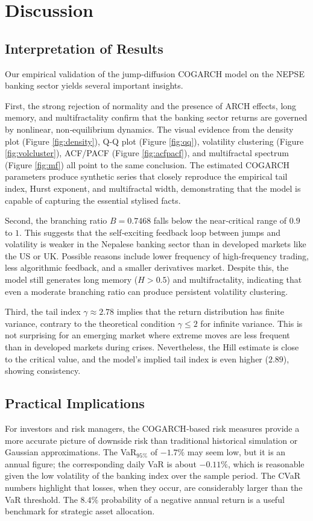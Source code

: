 \chapter{Discussion}

\section{Interpretation of Results}
Our empirical validation of the jump‑diffusion COGARCH model on the NEPSE banking sector yields several important insights.

First, the strong rejection of normality and the presence of ARCH effects, long memory, and multifractality confirm that the banking sector returns are governed by nonlinear, non‑equilibrium dynamics. The visual evidence from the density plot (Figure \ref{fig:density}), Q-Q plot (Figure \ref{fig:qq}), volatility clustering (Figure \ref{fig:volcluster}), ACF/PACF (Figure \ref{fig:acfpacf}), and multifractal spectrum (Figure \ref{fig:mf}) all point to the same conclusion. The estimated COGARCH parameters produce synthetic series that closely reproduce the empirical tail index, Hurst exponent, and multifractal width, demonstrating that the model is capable of capturing the essential stylised facts.

Second, the branching ratio $B=0.7468$ falls below the near‑critical range of $0.9$ to $1$. This suggests that the self‑exciting feedback loop between jumps and volatility is weaker in the Nepalese banking sector than in developed markets like the US or UK. Possible reasons include lower frequency of high‑frequency trading, less algorithmic feedback, and a smaller derivatives market. Despite this, the model still generates long memory ($H>0.5$) and multifractality, indicating that even a moderate branching ratio can produce persistent volatility clustering.

Third, the tail index $\gamma \approx 2.78$ implies that the return distribution has finite variance, contrary to the theoretical condition $\gamma \le 2$ for infinite variance. This is not surprising for an emerging market where extreme moves are less frequent than in developed markets during crises. Nevertheless, the Hill estimate is close to the critical value, and the model’s implied tail index is even higher ($2.89$), showing consistency.

\section{Practical Implications}
For investors and risk managers, the COGARCH‑based risk measures provide a more accurate picture of downside risk than traditional historical simulation or Gaussian approximations. The VaR$_{95\%}$ of $-1.7\%$ may seem low, but it is an annual figure; the corresponding daily VaR is about $-0.11\%$, which is reasonable given the low volatility of the banking index over the sample period. The CVaR numbers highlight that losses, when they occur, are considerably larger than the VaR threshold. The $8.4\%$ probability of a negative annual return is a useful benchmark for strategic asset allocation.

